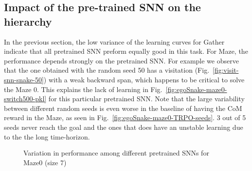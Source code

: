 \documentclass{article} %
\begin{document}
\subsection{Impact of the pre-trained SNN on the hierarchy}
\label{sec:seed_impact}
In the previous section, the low variance of the learning curves for Gather indicate that all pretrained SNN preform equally good in this task. For Maze, the performance depends strongly on the pretrained SNN. For example we observe that the one obtained with the random seed 50 has a visitation (Fig.\ \ref{fig:visit-snn-snake-50}) with a weak backward span, which happens to be critical to solve the Maze 0. This explains the lack of learning in Fig.\ \ref{fig:egoSnake-maze0-switch500-pkl} for this particular pretrained SNN. Note that the large variability between different random seeds is even worse in the baseline of having the CoM reward in the Maze, as seen in Fig.\ \ref{fig:egoSnake-maze0-TRPO-seeds}. 3 out of 5 seeds never reach the goal and the ones that does have an unstable learning due to the the long time-horizon.

\begin{figure}[h]
	\centering
	\caption{Variation in performance among different pretrained SNNs for Maze0 (size 7)}
	\label{fig:egoSnake-learning-curves-pkl}
\end{figure}
\end{document}
